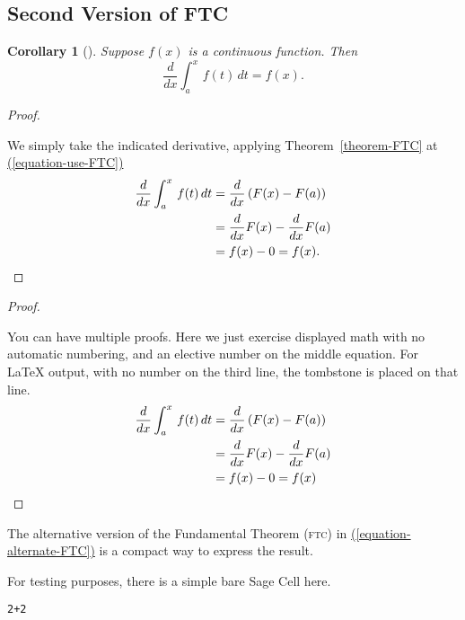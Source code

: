 \documentclass[10pt,]{article}
\newcommand{\acronym}[1]{\textsc{\MakeLowercase{#1}}}
\DeclareRobustCommand{\acronymintitle}[1]{\texorpdfstring{#1}{#1}}
\theoremstyle{plain}
\newtheorem{corollary}[theorem]{Corollary}
\theoremstyle{definition}
\theoremstyle{definition}
\theoremstyle{definition}
\theoremstyle{definition}
\theoremstyle{definition}
\theoremstyle{definition}
\numberwithin{equation}{section}
\newcommand{\definiteintegral}[4]{\int_{#1}^{#2}\,#3\,d#4}
\begin{document}
\subsection[{Second Version of \acronymintitle{FTC}}]{Second Version of \acronymintitle{FTC}}\label{subsection-1}
\begin{corollary}[{}]\label{corollary-FTC-derivative}
\hypertarget{p-33}{}%
Suppose \(f(x)\) is a continuous function.  Then%
\begin{equation}
\frac{d}{dx}\definiteintegral{a}{x}{f(t)}{t}=f(x)\text{.}\label{equation-alternate-FTC}
\end{equation}
%
\end{corollary}
\begin{proof}\hypertarget{proof-FTC-corollary}{}
\hypertarget{p-34}{}%
We simply take the indicated derivative, applying Theorem~\hyperref[theorem-FTC]{\ref{theorem-FTC}} at \hyperref[equation-use-FTC]{(\ref{equation-use-FTC})}%
\begin{align}
\frac{d}{dx}\definiteintegral{a}{x}{f(t)}{t}&=\frac{d}{dx}\left(F(x)-F(a)\right)\label{equation-use-FTC}\\
&=\frac{d}{dx}F(x)-\frac{d}{dx}F(a)\notag\\
&=f(x)-0 = f(x)\text{.}\label{equation-conclude}
\end{align}
%
\end{proof}
\begin{proof}\hypertarget{proof-3}{}
\hypertarget{p-35}{}%
You can have multiple proofs.  Here we just exercise displayed math with no automatic numbering, and an elective number on the middle equation.  For \LaTeX{} output, with no number on the third line, the tombstone is placed on that line.%
\begin{align}
\frac{d}{dx}\definiteintegral{a}{x}{f(t)}{t}&=\frac{d}{dx}\left(F(x)-F(a)\right)\notag\\
&=\frac{d}{dx}F(x)-\frac{d}{dx}F(a)\label{mrow-5}\\
&=f(x)-0 = f(x)\notag\qedhere
\end{align}
%
\end{proof}
\hypertarget{p-36}{}%
The alternative version of the Fundamental Theorem (\acronym{FTC}) in \hyperref[equation-alternate-FTC]{(\ref{equation-alternate-FTC})} is a compact way to express the result.%
\par
\hypertarget{p-37}{}%
For testing purposes, there is a simple bare Sage Cell here.%
\begin{lstlisting}[style=sageinput]
2+2
\end{lstlisting}
\end{document}
